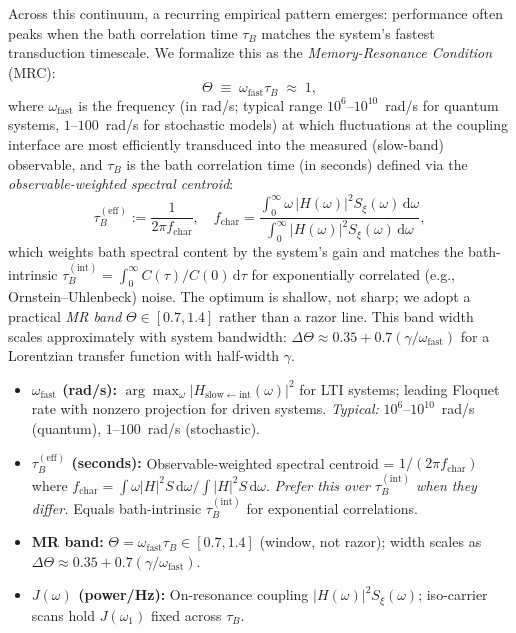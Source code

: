 \documentclass[11pt,letterpaper]{article}
\begin{document}
Across this continuum, a recurring empirical pattern emerges:
performance often peaks when the bath correlation time $\tau_B$ matches
the system's fastest transduction timescale. We formalize this as the
\emph{Memory-Resonance Condition} (MRC):
\begin{equation}
\Theta \;\equiv\; \omega_{\mathrm{fast}}\tau_B \;\approx\; 1,
\end{equation}
where $\omega_{\mathrm{fast}}$ is the frequency (in rad/s; typical range
$10^6$--$10^{10}$~rad/s for quantum systems, $1$--$100$~rad/s for
stochastic models) at which fluctuations at the coupling interface are
most efficiently transduced into the measured (slow-band) observable, and
$\tau_B$ is the bath correlation time (in seconds) defined via the
\emph{observable-weighted spectral centroid}:
\begin{equation}
\tau_B^{(\mathrm{eff})} := \frac{1}{2\pi f_{\mathrm{char}}}, \quad
f_{\mathrm{char}} = \frac{\int_0^\infty \omega\, |H(\omega)|^2 S_\xi(\omega)\,\mathrm{d}\omega}{\int_0^\infty |H(\omega)|^2 S_\xi(\omega)\,\mathrm{d}\omega},
\label{eq:tau_eff_early}
\end{equation}
which weights bath spectral content by the system's gain and matches the
bath-intrinsic $\tau_B^{(\mathrm{int})}=\int_0^\infty C(\tau)/C(0)\,\mathrm{d}\tau$
for exponentially correlated (e.g., Ornstein--Uhlenbeck) noise. The
optimum is shallow, not sharp; we adopt a practical \emph{MR band}
$\Theta\in[0.7,1.4]$ rather than a razor line. This band width scales
approximately with system bandwidth: $\Delta\Theta \approx 0.35 +
0.7(\gamma/\omega_{\mathrm{fast}})$ for a Lorentzian transfer function
with half-width $\gamma$.

\begin{tcolorbox}[colback=yellow!5!white,colframe=orange!75!black,title=Quick Reference: Core Definitions]
\begin{itemize}[nosep,leftmargin=*]
\item \textbf{$\omega_{\mathrm{fast}}$ (rad/s):} $\arg\max_\omega |H_{\mathrm{slow}\leftarrow\mathrm{int}}(\omega)|^2$ for LTI systems; leading Floquet rate with nonzero projection for driven systems. \emph{Typical:} $10^6$--$10^{10}$~rad/s (quantum), $1$--$100$~rad/s (stochastic).
\item \textbf{$\tau_B^{(\mathrm{eff})}$ (seconds):} Observable-weighted spectral centroid = $1/(2\pi f_{\mathrm{char}})$ where $f_{\mathrm{char}} = \int\omega|H|^2S\,\mathrm{d}\omega / \int|H|^2S\,\mathrm{d}\omega$. \emph{Prefer this over $\tau_B^{(\mathrm{int})}$ when they differ.} Equals bath-intrinsic $\tau_B^{(\mathrm{int})}$ for exponential correlations.
\item \textbf{MR band:} $\Theta = \omega_{\mathrm{fast}}\tau_B \in [0.7, 1.4]$ (window, not razor); width scales as $\Delta\Theta \approx 0.35 + 0.7(\gamma/\omega_{\mathrm{fast}})$.
\item \textbf{$J(\omega)$ (power/Hz):} On-resonance coupling $|H(\omega)|^2 S_\xi(\omega)$; iso-carrier scans hold $J(\omega_1)$ fixed across $\tau_B$.
\end{itemize}
\end{tcolorbox}
\end{document}
